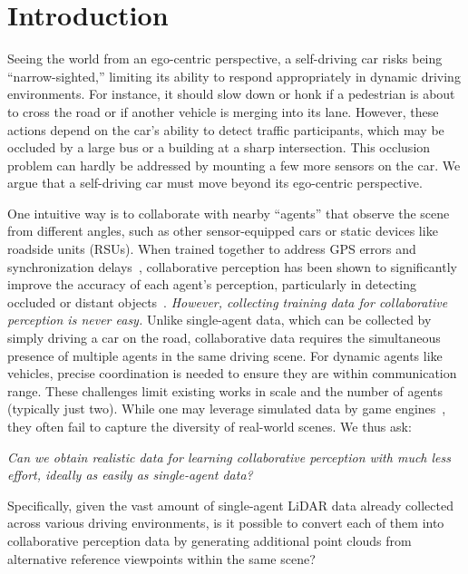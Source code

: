 \section{Introduction}
\label{sec:intro}

Seeing the world from an ego-centric perspective, a self-driving car risks being ``narrow-sighted,'' limiting its ability to respond appropriately in dynamic driving environments. For instance, it should slow down or honk if a pedestrian is about to cross the road or if another vehicle is merging into its lane. However, these actions depend on the car’s ability to detect traffic participants, which may be occluded by a large bus or a building at a sharp intersection. %
This occlusion problem can hardly be addressed by mounting a few more sensors on the car. We argue that a self-driving car must move beyond its ego-centric perspective.

One intuitive way is to collaborate with nearby ``agents'' that observe the scene from different angles, such as other sensor-equipped cars or static devices like roadside units (RSUs). When trained together to address GPS errors and synchronization delays~\citep{yoo2024learning}, collaborative perception has been shown to significantly improve the accuracy of each agent's perception, particularly in detecting occluded or distant objects~\citep{xu2022opv2v,chen2019cooper,rawashdeh2018collaborative, chen2019fcooper,wang2020v2vnet,liu2020when2com,li2021learning,hu2022where2comm,xu2022v2xvit,xu2023v2v4real,xiang2024v2x}. 
\emph{However, collecting training data for collaborative perception is never easy.} 
Unlike single-agent data, which can be collected by simply driving a car on the road, collaborative data requires the simultaneous presence of multiple agents in the same driving scene. For dynamic agents like vehicles, precise coordination is needed to ensure they are within communication range. These challenges limit existing works in scale and the number of agents (typically just two). While one may leverage simulated data by game engines~\citep{Dosovitskiy17carla}, they often fail to capture the diversity of real-world scenes. %
We thus ask:
\vspace{-2mm}
\begin{center}
    \color{blue}
    \emph{
    Can we obtain realistic data for learning collaborative perception with much less effort, ideally as easily as single-agent data?
    }
\end{center}
\vspace{-2mm}
Specifically, given the vast amount of single-agent LiDAR data already collected across various driving environments, is it possible to convert each of them into collaborative perception data by generating additional point clouds from alternative reference viewpoints within the same scene?


